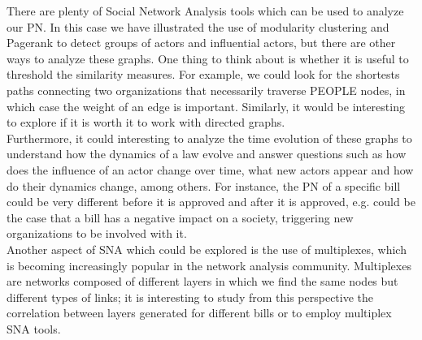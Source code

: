 There are plenty of Social Network Analysis tools which can be used to analyze our PN. In this case we have illustrated the use of modularity clustering and Pagerank to detect groups of actors and influential actors, but there are other ways to analyze these graphs. One thing to think about is whether it is useful to threshold the similarity measures. For example, we could look for the shortests paths connecting two organizations that necessarily traverse PEOPLE nodes, in which case the weight of an edge is important. Similarly, it would be interesting to explore if it is worth it to work with directed graphs. \\

Furthermore, it could interesting to analyze the time evolution of these graphs to understand how the dynamics of a law evolve and answer questions such as how does the influence of an actor change over time, what new actors appear and how do their dynamics change, among others. For instance, the PN of a specific bill could be very different before it is approved and after it is approved, e.g. could be the case that a bill has a negative impact on a society, triggering new organizations to be involved with it.\\

Another aspect of SNA which could be explored is the use of multiplexes, which is becoming increasingly popular in the network analysis community. Multiplexes are networks composed of different layers in which we find the same nodes but different types of links; it is interesting to study from this perspective the correlation between layers generated for different bills or to employ multiplex SNA tools.

